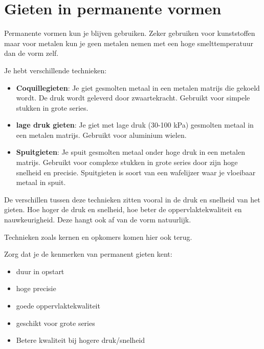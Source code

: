 \documentclass[a4paper,12pt,twoside]{report}
\begin{document}
\section{Gieten in permanente vormen}
Permanente vormen kun je blijven gebruiken. 
Zeker gebruiken voor kunststoffen maar voor metalen kun je geen metalen nemen met een hoge smelttemperatuur dan de vorm zelf.

Je hebt verschillende technieken:
\begin{itemize}
	\item \textbf{Coquillegieten}: Je giet gesmolten metaal in een metalen matrijs die gekoeld wordt. De druk wordt geleverd door zwaartekracht.
	      Gebruikt voor simpele stukken in grote series.
	\item \textbf{lage druk gieten}: Je giet met lage druk (30-100 kPa) gesmolten metaal in een metalen matrijs.
	      Gebruikt voor aluminium wielen. 
	\item \textbf{Spuitgieten}: Je spuit gesmolten metaal onder hoge druk in een metalen matrijs.
	      Gebruikt voor complexe stukken in grote series door zijn hoge snelheid en precisie.
	      Spuitgieten is soort van een wafelijzer waar je vloeibaar metaal in spuit.
\end{itemize}

De verschillen tussen deze technieken zitten vooral in de druk en snelheid van het gieten.
Hoe hoger de druk en snelheid, hoe beter de oppervlaktekwaliteit en nauwkeurigheid.
Deze hangt ook af van de vorm natuurlijk. 

Technieken zoals kernen en opkomers komen hier ook terug.
\begin{examenbox}
	Zorg dat je de kenmerken van permanent gieten kent:
	\begin{itemize}
		\item duur in opstart
		\item hoge precisie
		\item goede oppervlaktekwaliteit
		\item geschikt voor grote series
		\item Betere kwaliteit bij hogere druk/snelheid
	\end{itemize}
\end{examenbox}
\end{document}
